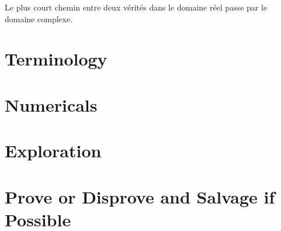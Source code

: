 \documentclass{homework}
\author{Jim Fowler}
\begin{document}
\maketitle

\begin{inspiration}
Le plus court chemin entre deux v\'erit\'es dans le domaine r\'eel passe par le domaine complexe.
\end{inspiration}

\section{Terminology}

\section{Numericals}

\section{Exploration}

\section{Prove or Disprove and Salvage if Possible}
\end{document}
